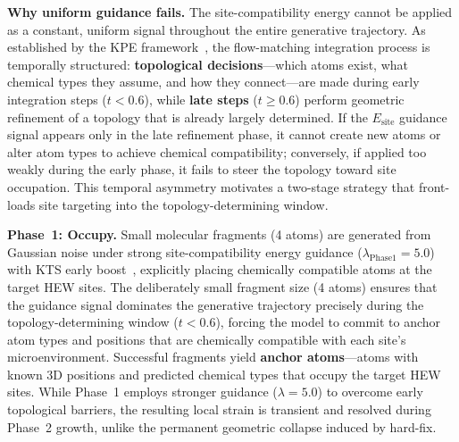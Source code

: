 \documentclass{article}
\begin{document}
\textbf{Why uniform guidance fails.}
The site-compatibility energy cannot be applied as a constant, uniform signal
throughout the entire generative trajectory.  As established by the KPE
framework~\cite{li2026kpe}, the flow-matching integration process is
temporally structured: \textbf{topological decisions}---which atoms exist,
what chemical types they assume, and how they connect---are made during early
integration steps ($t < 0.6$), while \textbf{late steps} ($t \ge 0.6$) perform
geometric refinement of a topology that is already largely determined.  If the
$E_{\text{site}}$ guidance signal appears only in the late refinement phase,
it cannot create new atoms or alter atom types to achieve chemical
compatibility; conversely, if applied too weakly during the early phase, it
fails to steer the topology toward site occupation.  This temporal asymmetry
motivates a two-stage strategy that front-loads site targeting into the
topology-determining window.

\textbf{Phase~1: Occupy.}
Small molecular fragments (4 atoms) are generated from Gaussian noise under
strong site-compatibility energy guidance ($\lambda_{\text{Phase1}}=5.0$) with
KTS early boost~\cite{li2026kpe}, explicitly placing chemically compatible
atoms at the target HEW sites.  The deliberately small fragment size (4 atoms)
ensures that the guidance signal dominates the generative trajectory precisely
during the topology-determining window ($t < 0.6$), forcing the model to commit
to anchor atom types and positions that are chemically compatible with each
site's microenvironment.  Successful fragments yield
\textbf{anchor atoms}---atoms with known 3D positions and predicted chemical
types that occupy the target HEW sites.  While Phase~1 employs stronger
guidance ($\lambda=5.0$) to overcome early topological barriers, the
resulting local strain is transient and resolved during Phase~2 growth,
unlike the permanent geometric collapse induced by hard-fix.
\end{document}
